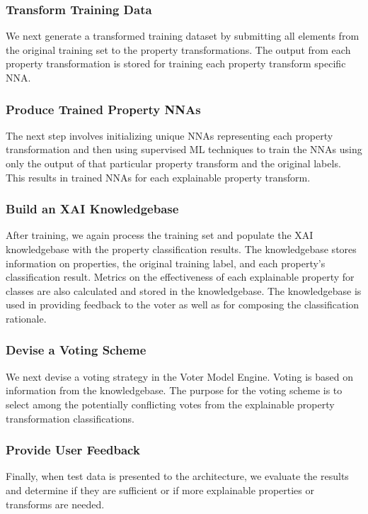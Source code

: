 \documentclass[conference]{IEEEtran}
\begin{document}
\subsubsection{Transform Training Data} 
We next generate a transformed training dataset by submitting all elements from the original training set to the property transformations.  The output from each property transformation is stored for training each property transform specific NNA. 

\subsubsection{Produce Trained Property NNAs}
The next step involves initializing unique NNAs representing each property transformation and then using supervised ML techniques to train the NNAs using only the output of that particular property transform and the original labels.  This results in trained NNAs for each explainable property transform.

\subsubsection{Build an XAI Knowledgebase}
After training, we again process the training set and populate the XAI knowledgebase with the property classification results.  The knowledgebase stores information on properties, the original training label, and each property's classification result.  Metrics on the effectiveness of each explainable property for classes are also calculated and stored in the knowledgebase.  The knowledgebase is used in providing feedback to the voter as well as for composing the classification rationale.

\subsubsection{Devise a Voting Scheme}
We next devise a voting strategy in the Voter Model Engine.  Voting is based on information from the knowledgebase.  The purpose for the voting scheme is to select among the potentially conflicting votes from the explainable property transformation classifications.

\subsubsection{Provide User Feedback}
Finally, when test data is presented to the architecture, we evaluate the results and determine if they are sufficient or if more explainable properties or transforms are needed.
\end{document}
